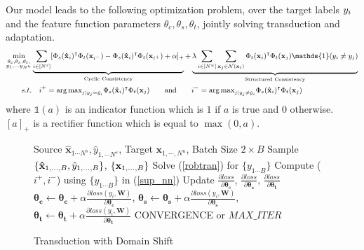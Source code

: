 Our model leads to the following optimization problem, over the target labels $y_i$ and the feature function parameters $\theta_c, \theta_s, \theta_t$, jointly solving transduction and adaptation. 
\begin{equation}
\small
\begin{aligned}
\min_{\substack{\theta_c,\theta_s,\theta_t, \\ y_1, \ldots y_{N^u}}} &\underbrace{\sum_{i \in [N^s]} [\Phi_s(\xsi)^\intercal \Phi_t(\mathbf{x}_{i^-}) -\Phi_s(\xsi)^\intercal \Phi_t(\mathbf{x}_{i^+}) + \alpha]_{+}}_{\text{Cyclic Consistency}}  +\underbrace{\lambda \sum_{i \in [N^u]} \sum_{\xuj \in \mathcal{N}(\xui)}  \Phi_t(\xui)^\intercal \Phi_t(\xuj) \mathds{1}(y_i \neq y_j)}_{\text{Structured Consistency}}\\
s.t. &\quad i^{+} = {\arg\max}_{j | y_j = \hat{y}_i} \Phi_s(\xsi)^\intercal \Phi_t(\xuj) \quad \quad \text{and} \quad \quad  i^{-} = {\arg\max}_{j | y_j \neq \hat{y}_i}  \Phi_s(\xsi)^\intercal \Phi_t(\xuj)
\end{aligned}
\label{loss}
\end{equation}
where $\mathds{1}(a)$ is an indicator function which is $1$ if $a$ is true and $0$ otherwise. $[a]_+$ is a rectifier function which is equal to $\max(0, a)$.
\begin{figure}
    \begin{minipage}{0.5\textwidth}
    \vspace{-1mm}
\begin{algorithm}[H]
   \caption{Transduction with Domain Shift}
   \label{alg:example}
  \small
\begin{algorithmic}
    Source $\mathbf{\hat{x}}_{1 \cdots N^s},\hat{y}_{1, \cdots N^s}$, Target $\mathbf{x}_{1,\cdots,N^u}$, Batch Size $2\times B$
   \REPEAT
   \STATE  Sample $\{\mathbf{\hat{x}}_{1,\ldots,B},\hat{y}_{1,\ldots,B} \}$, $\{\mathbf{x}_{1,\ldots,B}\}$
   \STATE Solve (\ref{robtran}) for $\{y_{1 \cdots B}\}$
   \STATE Compute ($i^+, i^-$) using $\{y_{1 \cdots B}\}$ in (\ref{sup_nn})
   \STATE Update $\frac{\partial loss}{\partial \mathbf{\theta_c}}$,  $\frac{\partial loss}{\partial \mathbf{\theta_s}}$, $\frac{\partial loss}{\partial \mathbf{\theta_t}}$
   \ENDIF
   \ENDFOR
   \STATE $\mathbf{\theta_c} \leftarrow \mathbf{\theta_c} + \alpha \frac{\partial loss (y_i, \mathbf{W})}{\partial \mathbf{\theta_c}}$, $\mathbf{\theta_s} \leftarrow \mathbf{\theta_s} + \alpha \frac{\partial loss (y_i, \mathbf{W})}{\partial \mathbf{\theta_s}}$, $\mathbf{\theta_t} \leftarrow \mathbf{\theta_t} + \alpha \frac{\partial loss (y_i, \mathbf{W})}{\partial \mathbf{\theta_t}}$
   \UNTIL CONVERGENCE or $MAX\_ITER$
\end{algorithmic}
\end{algorithm}
\vspace{-17mm}
  \end{minipage}
  \end{figure}


